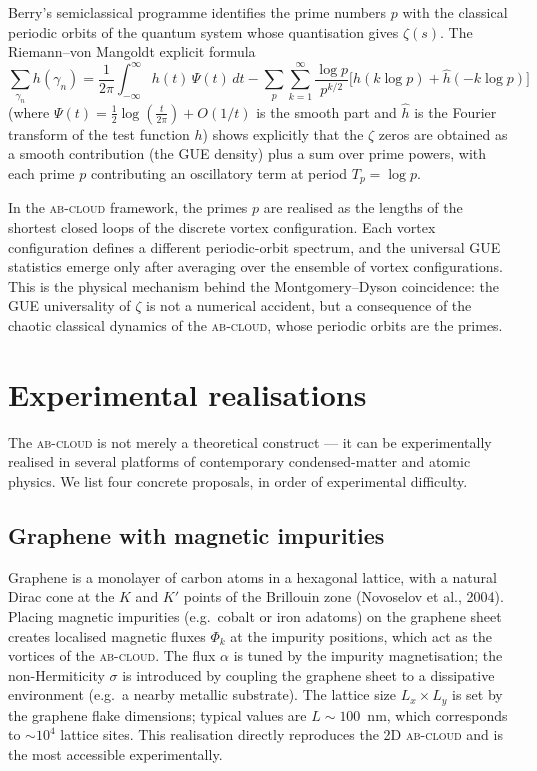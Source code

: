 \documentclass[11pt,a4paper]{article}
\theoremstyle{plain}
\theoremstyle{definition}
\theoremstyle{remark}
\newcommand{\Abcloud}{\textsc{ab-cloud}}
\begin{document}
Berry's semiclassical programme identifies the prime numbers $p$ with the classical periodic orbits of the quantum system whose quantisation gives $\zeta(s)$. The Riemann--von Mangoldt explicit formula
\begin{equation}
    \sum_{\gamma_n} h(\gamma_n) = \frac{1}{2\pi}\int_{-\infty}^{\infty} h(t)\,\Psi(t)\,dt - \sum_p \sum_{k=1}^\infty \frac{\log p}{p^{k/2}}\bigl[\hat h(k\log p) + \hat h(-k\log p)\bigr]
\end{equation}
(where $\Psi(t) = \tfrac{1}{2}\log(\tfrac{t}{2\pi}) + O(1/t)$ is the smooth part and $\hat h$ is the Fourier transform of the test function $h$) shows explicitly that the $\zeta$ zeros are obtained as a smooth contribution (the GUE density) plus a sum over prime powers, with each prime $p$ contributing an oscillatory term at period $T_p = \log p$.

In the \Abcloud{} framework, the primes $p$ are realised as the lengths of the shortest closed loops of the discrete vortex configuration. Each vortex configuration defines a different periodic-orbit spectrum, and the universal GUE statistics emerge only after averaging over the ensemble of vortex configurations. This is the physical mechanism behind the Montgomery--Dyson coincidence: the GUE universality of $\zeta$ is not a numerical accident, but a consequence of the chaotic classical dynamics of the \Abcloud{}, whose periodic orbits are the primes.

\section{Experimental realisations}\label{sec:exp}

The \Abcloud{} is not merely a theoretical construct — it can be experimentally realised in several platforms of contemporary condensed-matter and atomic physics. We list four concrete proposals, in order of experimental difficulty.

\subsection{Graphene with magnetic impurities}

Graphene is a monolayer of carbon atoms in a hexagonal lattice, with a natural Dirac cone at the $K$ and $K'$ points of the Brillouin zone (Novoselov et al., 2004). Placing magnetic impurities (e.g.\ cobalt or iron adatoms) on the graphene sheet creates localised magnetic fluxes $\Phi_k$ at the impurity positions, which act as the vortices of the \Abcloud{}. The flux $\alpha$ is tuned by the impurity magnetisation; the non-Hermiticity $\sigma$ is introduced by coupling the graphene sheet to a dissipative environment (e.g.\ a nearby metallic substrate). The lattice size $L_x\times L_y$ is set by the graphene flake dimensions; typical values are $L\sim 100$~nm, which corresponds to $\sim 10^4$ lattice sites. This realisation directly reproduces the 2D \Abcloud{} and is the most accessible experimentally.
\end{document}
